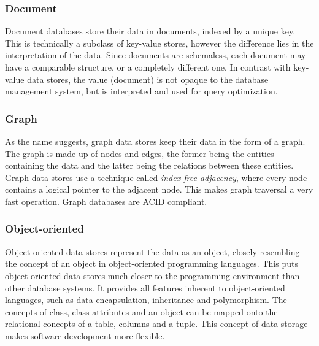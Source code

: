 \subsubsection{Document}
\label{sec:document}

Document databases store their data in documents, indexed by a unique key. This is technically a subclass of key-value stores, however the difference lies in the interpretation of the data. Since documents are schemaless, each document may have a comparable structure, or a completely different one. In contrast with key-value data stores, the value (document) is not opaque to the database management system, but is interpreted and used for query optimization.

\subsubsection{Graph}
\label{sec:graph}

As the name suggests, graph data stores keep their data in the form of a graph. The graph is made up of nodes and edges, the former being the entities containing the data and the latter being the relations between these entities. Graph data stores use a technique called \textit{index-free adjacency}, where every node contains a logical pointer to the adjacent node. This makes graph traversal a very fast operation. Graph databases are ACID compliant.

\subsubsection{Object-oriented}
\label{sec:object-oriented}

Object-oriented data stores represent the data as an object, closely resembling the concept of an object in object-oriented programming languages. This puts object-oriented data stores much closer to the programming environment than other database systems. It provides all features inherent to object-oriented languages, such as data encapsulation, inheritance and polymorphism. The concepts of class, class attributes and an object can be mapped onto the relational concepts of a table, columns and a tuple. This concept of data storage makes software development more flexible.


